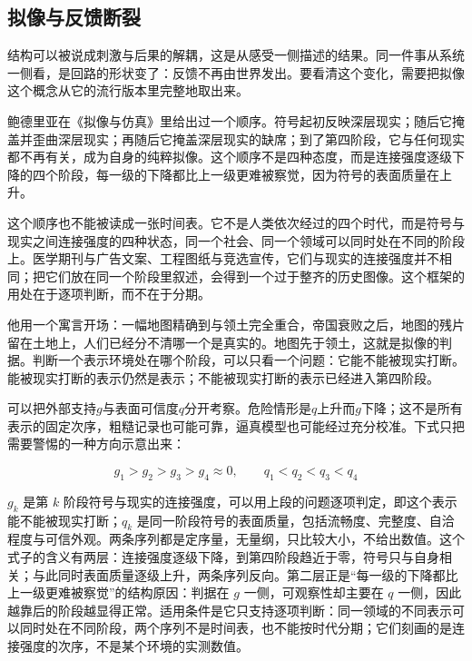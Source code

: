 \subsection{拟像与反馈断裂}

结构可以被说成刺激与后果的解耦，这是从感受一侧描述的结果。同一件事从系统一侧看，是回路的形状变了：反馈不再由世界发出。要看清这个变化，需要把拟像这个概念从它的流行版本里完整地取出来。


鲍德里亚在《拟像与仿真》里给出过一个顺序。符号起初反映深层现实；随后它掩盖并歪曲深层现实；再随后它掩盖深层现实的缺席；到了第四阶段，它与任何现实都不再有关，成为自身的纯粹拟像\cite{baudrillard1981simulacres}。这个顺序不是四种态度，而是连接强度逐级下降的四个阶段，每一级的下降都比上一级更难被察觉，因为符号的表面质量在上升。

这个顺序也不能被读成一张时间表。它不是人类依次经过的四个时代，而是符号与现实之间连接强度的四种状态，同一个社会、同一个领域可以同时处在不同的阶段上。医学期刊与广告文案、工程图纸与竞选宣传，它们与现实的连接强度并不相同；把它们放在同一个阶段里叙述，会得到一个过于整齐的历史图像。这个框架的用处在于逐项判断，而不在于分期。

他用一个寓言开场：一幅地图精确到与领土完全重合，帝国衰败之后，地图的残片留在土地上，人们已经分不清哪一个是真实的\cite{borges1946rigor}。地图先于领土，这就是拟像的判据。判断一个表示环境处在哪个阶段，可以只看一个问题：它能不能被现实打断。能被现实打断的表示仍然是表示；不能被现实打断的表示已经进入第四阶段。

可以把外部支持$g$与表面可信度$q$分开考察。危险情形是$q$上升而$g$下降；这不是所有表示的固定次序，粗糙记录也可能可靠，逼真模型也可能经过充分校准。下式只把需要警惕的一种方向示意出来：

\begin{equation}
g_1>g_2>g_3>g_4\approx 0,\qquad q_1<q_2<q_3<q_4
\end{equation}

$g_k$ 是第 $k$ 阶段符号与现实的连接强度，可以用上段的问题逐项判定，即这个表示能不能被现实打断；$q_k$ 是同一阶段符号的表面质量，包括流畅度、完整度、自洽程度与可信外观。两条序列都是定序量，无量纲，只比较大小，不给出数值。这个式子的含义有两层：连接强度逐级下降，到第四阶段趋近于零，符号只与自身相关；与此同时表面质量逐级上升，两条序列反向。第二层正是“每一级的下降都比上一级更难被察觉”的结构原因：判据在 $g$ 一侧，可观察性却主要在 $q$ 一侧，因此越靠后的阶段越显得正常。适用条件是它只支持逐项判断：同一领域的不同表示可以同时处在不同阶段，两个序列不是时间表，也不能按时代分期；它们刻画的是连接强度的次序，不是某个环境的实测数值。

